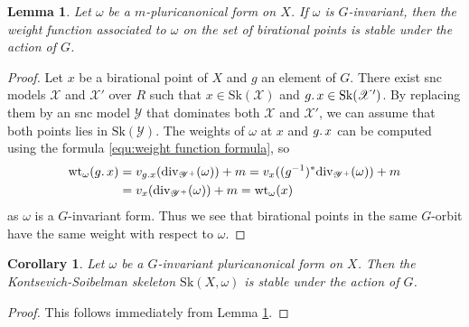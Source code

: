 \documentclass{amsart}%
\numberwithin{equation}{subsection}
\theoremstyle{plain2}
\newtheorem{cor}[equation]{Corollary}
\newtheorem{lemma}[equation]{Lemma}
\theoremstyle{definition2}
\theoremstyle{stepstyle}
\theoremstyle{point}
\theoremstyle{subpoint}
\newcommand{\cX}{\ensuremath{\mathscr{X}}}
\newcommand{\cY}{\ensuremath{\mathscr{Y}}}
\renewcommand{\cY}{\ensuremath{\mathscr{Y}}}
\newcommand{\divisor}{\mathrm{div}}
\newcommand{\weight}{\mathrm{wt}}
\newcommand{\Sk}{\mathrm{Sk}}
\begin{document}
\begin{lemma} \label{lemma G invariant forms and weight function}
Let $\omega$ be a $m$-pluricanonical form on $X$. If $\omega$ is $G$-invariant, then the weight function associated to $\omega$ on the set of birational points is stable under the action of $G$. 
\end{lemma}
\begin{proof}
Let $x$ be a birational point of $X$ and $g$ an element of $G$. There exist snc models $\cX$ and $\cX'$ over $R$ such that $x \in \Sk(\cX)$ and $g \ldotp x \in \Sk(\cX')$. By replacing them by an snc model $\cY$ that dominates both $\cX$ and $\cX'$, we can assume that both points lies in $\Sk(\cY)$. The weights of $\omega$ at $x$ and $g \ldotp x$ can be computed using the formula \ref{equ:weight function formula}, so \begin{align*} \weight_{\omega}(g \ldotp x)& = v_{g \ldotp x}(\divisor_{\cY^+}(\omega)) + m  = v_{x}((g^{-1})^*\divisor_{\cY^+}(\omega)) + m  \\ & = v_{x}(\divisor_{\cY^+}(\omega)) + m = \weight_{\omega}(x) \end{align*} as $\omega$ is a $G$-invariant form. Thus we see that birational points in the same $G$-orbit have the same weight with respect to $\omega$. 
\end{proof}

\begin{cor} \label{cor:G inv forms and KS}
Let $\omega$ be a $G$-invariant pluricanonical form on $X$. Then the Kontsevich-Soibelman skeleton $\Sk(X,\omega)$ is stable under the action of $G$.
\end{cor}
\begin{proof}
This follows immediately from Lemma \ref{lemma G invariant forms and weight function}.
\end{proof}
\end{document}
